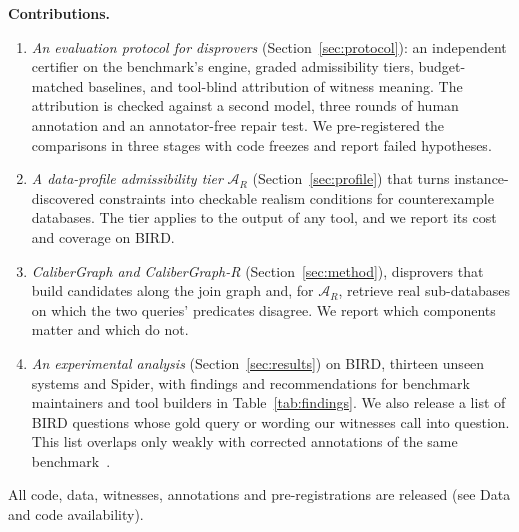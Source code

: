 \textbf{Contributions.}
\begin{enumerate}
\item \emph{An evaluation protocol for disprovers} (Section~\ref{sec:protocol}): an independent certifier on the benchmark's engine, graded admissibility tiers, budget-matched baselines, and tool-blind attribution of witness meaning. The attribution is checked against a second model, three rounds of human annotation and an annotator-free repair test. We pre-registered the comparisons in three stages with code freezes and report failed hypotheses.
\item \emph{A data-profile admissibility tier} $\mathcal A_R$ (Section~\ref{sec:profile}) that turns instance-discovered constraints into checkable realism conditions for counterexample databases. The tier applies to the output of any tool, and we report its cost and coverage on BIRD.
\item \emph{CaliberGraph and CaliberGraph-R} (Section~\ref{sec:method}), disprovers that build candidates along the join graph and, for $\mathcal A_R$, retrieve real sub-databases on which the two queries' predicates disagree. We report which components matter and which do not.
\item \emph{An experimental analysis} (Section~\ref{sec:results}) on BIRD, thirteen unseen systems and Spider, with findings and recommendations for benchmark maintainers and tool builders in Table~\ref{tab:findings}. We also release a list of  BIRD questions whose gold query or wording our witnesses call into question. This list overlaps only weakly with corrected annotations of the same benchmark~\cite{jin2026annotation}.
\end{enumerate}
All code, data, witnesses, annotations and pre-registrations are released (see Data and code availability).
